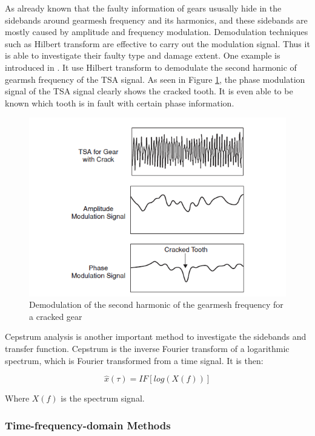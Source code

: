 As already known that the faulty information of gears ususally hide in the sidebands around gearmesh frequency and its harmonics, and these sidebands are mostly caused by amplitude and frequency modulation. Demodulation techniques such as Hilbert transform are effective to carry out the modulation signal. Thus it is able to investigate their faulty type and damage extent.
One example is introduced in \cite{mc4}. It use Hilbert transform to demodulate the second harmonic of gearmsh frequency of the TSA signal. As seen in Figure \ref{demodulation}, the phase modulation signal of the TSA signal clearly shows the cracked tooth. It is even able to be known which tooth is in fault with certain phase information.

\begin{figure}
	\centering
	\includegraphics{demodulation}
	\caption{Demodulation of the second harmonic of the gearmesh frequency for a cracked gear \cite{mc4}}
	\label{demodulation}
\end{figure}

Cepstrum analysis is another important method to investigate the sidebands and transfer function. Cepstrum is the inverse Fourier transform of a logarithmic spectrum, which is Fourier transformed from a time signal. It is then:

\begin{equation}
\hat{x}(\tau) = IF[log(X(f))]
\end{equation}

Where $X(f)$ is the spectrum signal.

\subsubsection{Time-frequency-domain Methods}

